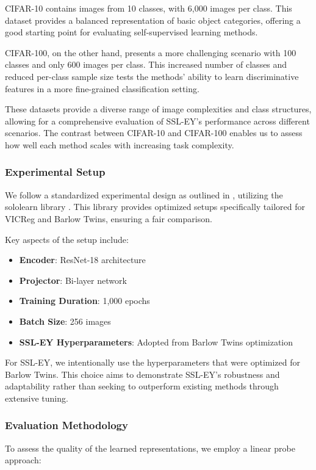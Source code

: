 CIFAR-10 contains images from 10 classes, with 6,000 images per class. This dataset provides a balanced representation of basic object categories, offering a good starting point for evaluating self-supervised learning methods.

CIFAR-100, on the other hand, presents a more challenging scenario with 100 classes and only 600 images per class. This increased number of classes and reduced per-class sample size tests the methods' ability to learn discriminative features in a more fine-grained classification setting.

These datasets provide a diverse range of image complexities and class structures, allowing for a comprehensive evaluation of SSL-EY's performance across different scenarios. The contrast between CIFAR-10 and CIFAR-100 enables us to assess how well each method scales with increasing task complexity.

\subsubsection{Experimental Setup}
We follow a standardized experimental design as outlined in \citet{tong2023emp}, utilizing the sololearn library \citep{da2022solo}. This library provides optimized setups specifically tailored for VICReg and Barlow Twins, ensuring a fair comparison.

Key aspects of the setup include:
\begin{itemize}
    \item \textbf{Encoder}: ResNet-18 architecture
    \item \textbf{Projector}: Bi-layer network
    \item \textbf{Training Duration}: 1,000 epochs
    \item \textbf{Batch Size}: 256 images
    \item \textbf{SSL-EY Hyperparameters}: Adopted from Barlow Twins optimization
\end{itemize}

For SSL-EY, we intentionally use the hyperparameters that were optimized for Barlow Twins. This choice aims to demonstrate SSL-EY's robustness and adaptability rather than seeking to outperform existing methods through extensive tuning.

\subsubsection{Evaluation Methodology}
To assess the quality of the learned representations, we employ a linear probe approach:

